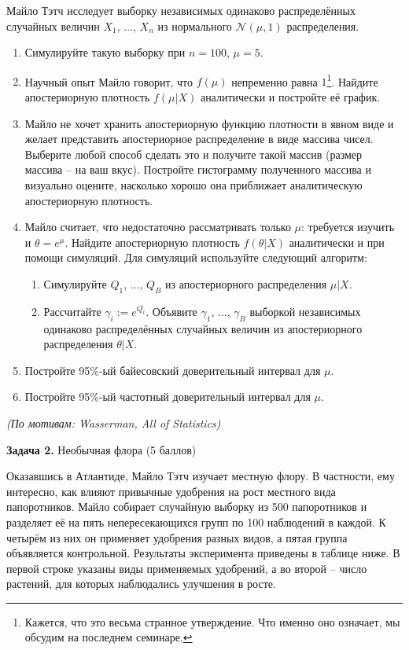 \documentclass[10pt, a4paper]{extarticle}
\begin{document}
	Майло Тэтч исследует выборку независимых одинаково распределённых случайных величин $X_1$, $\ldots$, $X_n$ из нормального $\mathcal{N}(\mu, 1)$ распределения.
	\begin{enumerate}[label = \alph*)]
		\item Симулируйте такую выборку при $n = 100$, $\mu = 5$.
		\item Научный опыт Майло говорит, что $f(\mu)$ непременно равна $1$\footnote{Кажется, что это весьма странное утверждение. Что именно оно означает, мы обсудим на последнем семинаре.}. Найдите апостериорную плотность $f(\mu | X)$ аналитически и постройте её график.
		\item Майло не хочет хранить апостериорную функцию плотности в явном виде и желает представить апостериорное распределение в виде массива чисел. Выберите любой способ сделать это и получите такой массив (размер массива -- на ваш вкус). Постройте гистограмму полученного массива и визуально оцените, насколько хорошо она приближает аналитическую апостериорную плотность.
		\item Майло считает, что недостаточно рассматривать только $\mu$: требуется изучить и $\theta = e^{\mu}$. Найдите апостериорную плотность $f(\theta | X)$ аналитически и при помощи симуляций. Для симуляций используйте следующий алгоритм:
		\begin{enumerate}
			\item Симулируйте $Q_1$, $\ldots$, $Q_B$ из апостериорного распределения $\mu | X$.
			\item Рассчитайте $\gamma_i := e^{Q_i}$. Объявите $\gamma_1$, $\ldots$, $\gamma_B$ выборкой независимых одинаково распределённых случайных величин из апостериорного распределения $\theta | X$.
		\end{enumerate}
		\item Постройте 95\%-ый байесовский доверительный интервал для $\mu$.
		\item Постройте 95\%-ый частотный доверительный интервал для $\mu$. 
	\end{enumerate}

	\begin{flushright}
		\textit{(По мотивам: Wasserman, All of Statistics)}
	\end{flushright}
	\vspace{1em}
	
	{\Large \textbf{Задача 2.} Необычная флора (5 баллов)}
	
	Оказавшись в Атлантиде, Майло Тэтч изучает местную флору. В частности, ему интересно, как влияют привычные удобрения на рост местного вида папоротников. Майло собирает случайную выборку из 500 папоротников и разделяет её на пять непересекающихся групп по 100 наблюдений в каждой. К четырём из них он применяет удобрения разных видов, а пятая группа объявляется контрольной. Результаты эксперимента приведены в таблице ниже. В первой строке указаны виды применяемых удобрений, а во второй -- число растений, для которых наблюдались улучшения в росте. 
	
\end{document}
